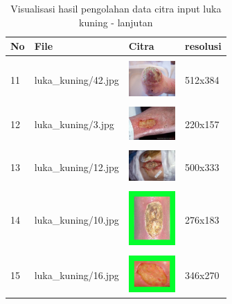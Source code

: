 \begin{table}[H]
	\centering
	\caption{Visualisasi hasil pengolahan data citra input luka kuning - lanjutan}
	\label{tabel_input_6}
	\begin{tabular}{|m{0.2in}|m{1.2in}|m{0.7in}|m{0.7in}|}
		\hline
		\textbf{No} & \textbf{File} & \textbf{Citra} & \textbf{resolusi} \\
		\hline
		
		& &  &  \\
		11& 
		luka\_kuning/42.jpg &
		\includegraphics[width=0.7in]{gambar/dataset_citra/luka_kuning/bahan/42.jpg}&
		512x384\\
		\hline
		
		& &  &  \\
		12& 
		luka\_kuning/3.jpg &
		\includegraphics[width=0.7in]{gambar/dataset_citra/luka_kuning/bahan/3.jpg}&
		220x157\\
		\hline
		
		& &  &  \\
		13& 
		luka\_kuning/12.jpg &
		\includegraphics[width=0.7in]{gambar/dataset_citra/luka_kuning/bahan/12.jpg}&
		500x333\\
		\hline
		
		& &  &  \\
		14& 
		luka\_kuning/10.jpg &
		\includegraphics[width=0.7in]{gambar/dataset_citra/luka_kuning/bahan/10.jpg}&
		276x183\\
		\hline
				
		& &  &  \\
		15 & 
		luka\_kuning/16.jpg &
		\includegraphics[width=0.7in]{gambar/dataset_citra/luka_kuning/bahan/16.jpg}&
		346x270\\
		\hline
	\end{tabular}
\end{table}


